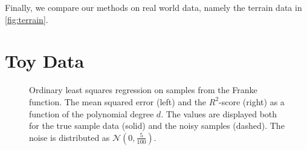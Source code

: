 \documentclass[dvipsnames, article, a4paper, oneside, 12pt]{memoir}
\newcommand{\N}{\mathcal{N}}
\begin{document}
  Finally, we compare our methods on real world data, namely the terrain data
  in \cref{fig:terrain}.
  
  \section{Toy Data}
  
  \begin{figure}
    \centering
    \caption{Ordinary least squares regression on samples from the Franke
      function. The mean squared error (left) and the \(R^2\)-score (right) as
      a function of the polynomial degree \( d \). The values are displayed
      both for the true sample data (solid) and the noisy samples (dashed). The
      noise is distributed as \( \N(0, \tfrac{5}{100})\).}
    \label{fig:ols_scores}
  \end{figure}
\end{document}
